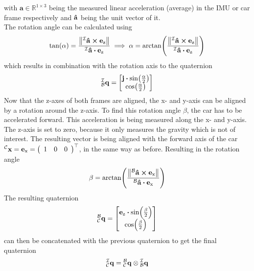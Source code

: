 with $\mathbf{a} \in \mathbb{R}^{1\times3}$ being the measured linear acceleration (average) in the IMU or car frame respectively and $\vu{a}$ being the unit vector of it.\\
The rotation angle can be calculated using
\begin{equation}
    \tan(\alpha) = \frac{\norm{\vincs{\vu{a}}{i} \cp \vb{e}_\mathrm{z}}}{\vincs{\vu{a}}{i} \vdot \vb{e}_\mathrm{z}} \implies
    \alpha = \arctan(\frac{\norm{\vincs{\vu{a}}{i} \cp \vb{e}_\mathrm{z}}}{\vincs{\vu{a}}{i} \vdot \vb{e}_\mathrm{z}})
\end{equation}
which results in combination with the rotation axis to the quaternion
\begin{equation}
    \qtf{i}{b} =
    \begin{bmatrix}
        \vb{j}\vdot\sin(\frac{\alpha}{2}) \\
        \cos(\frac{\alpha}{2})
    \end{bmatrix}
\end{equation}
Now that the z-axes of both frames are aligned, the x- and y-axis can be aligned by a rotation around the z-axis.
To find this rotation angle $\beta$, the car has to be accelerated forward.
This acceleration is being measured along the x- and y-axis.
The z-axis is set to zero, because it only measures the gravity which is not of interest.
The resulting vector is being aligned with the forward axis of the car $\vincs{x}{c} = \mathbf{e}_\mathrm{x} = \left(\begin{array}{lll} 1 & 0 & 0 \end{array}\right)^{\top}$, in the same way as before.
Resulting in the rotation angle
\begin{equation}
    \beta = \arctan(\frac{\norm{\vincs{\vu{a}}{b} \cp \vb{e}_\mathrm{x}}}{\vincs{\vu{a}}{b} \vdot \vb{e}_\mathrm{x}})
\end{equation}
The resulting quaternion
\begin{equation}
    \qtf{b}{c} =
    \begin{bmatrix}
        \vb{e}_\mathrm{z}\vdot\sin(\frac{\beta}{2}) \\
        \cos(\frac{\beta}{2})
    \end{bmatrix}
\end{equation}
can then be concatenated with the previous quaternion to get the final quaternion
\begin{equation}
    \qtf{i}{c} = \qtf{b}{c} \otimes  \qtf{i}{b}
\end{equation}
